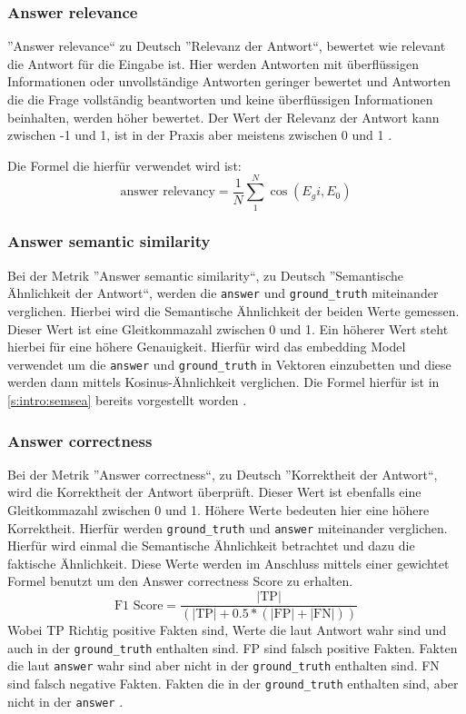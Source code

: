 \subsubsection{Answer relevance}
''Answer relevance`` zu Deutsch ''Relevanz der Antwort``, bewertet wie 
relevant die Antwort für die Eingabe ist. Hier werden Antworten
mit überflüssigen Informationen oder unvollständige Antworten 
geringer bewertet und Antworten die die Frage vollständig beantworten 
und keine überflüssigen Informationen beinhalten, werden höher bewertet.
Der Wert der Relevanz der Antwort kann zwischen -1 und 1, ist 
in der Praxis aber meistens zwischen 0 und 1 \cite{AnswerRelevanceRagas}. \par
Die Formel die hierfür verwendet wird ist: 
\[\text{answer relevancy} = \frac{1}{N}\sum_{1}^{N}\cos(E_gi, E_0)\]

\subsubsection{Answer semantic similarity}
Bei der Metrik ''Answer semantic similarity``, zu Deutsch ''Semantische Ähnlichkeit der Antwort``,
werden die \verb|answer| und \verb|ground_truth| miteinander verglichen.
Hierbei wird die Semantische Ähnlichkeit der beiden Werte gemessen.
Dieser Wert ist eine Gleitkommazahl zwischen 0 und 1. Ein höherer
Wert steht hierbei für eine höhere Genauigkeit. Hierfür wird das
embedding Model verwendet um die \verb|answer| und \verb|ground_truth| 
in Vektoren einzubetten und diese werden dann mittels Kosinus-Ähnlichkeit 
verglichen. Die Formel hierfür ist in \ref*{s:intro:semsea} 
bereits vorgestellt worden \cite{AnswerSemanticSimilarity}.

\subsubsection{Answer correctness}
Bei der Metrik ''Answer correctness``, zu Deutsch ''Korrektheit der Antwort``,
wird die Korrektheit der Antwort überprüft. 
Dieser Wert ist ebenfalls eine Gleitkommazahl zwischen 0 und 1.
Höhere Werte bedeuten hier eine höhere Korrektheit.
Hierfür werden \verb|ground_truth| und \verb|answer| miteinander
verglichen. Hierfür wird einmal die Semantische Ähnlichkeit 
betrachtet und dazu die faktische Ähnlichkeit. Diese Werte werden 
im Anschluss mittels einer gewichtet Formel 
benutzt um den Answer correctness Score zu erhalten.
\[\text{F1 Score} = \frac{|\text{TP}|}{(|\text{TP}| + 0.5 * (|\text{FP}| + |\text{FN}|))}\]
Wobei TP Richtig positive Fakten sind, Werte
die laut Antwort wahr sind und auch in der \verb|ground_truth|
enthalten sind.
FP sind falsch positive Fakten. Fakten die laut \verb|answer| wahr 
sind aber nicht in der \verb|ground_truth| enthalten sind.
FN sind falsch negative Fakten. Fakten die in der 
\verb|ground_truth| enthalten sind, aber nicht in der \verb|answer| \cite{AnswerCorrectnessRagas}.

